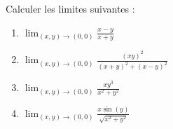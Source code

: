 
\begin{exercice}\label{exomazhe-0000}

	Calculer les limites suivantes :
	\begin{enumerate}

		\item
			$\lim_{(x,y)\to(0,0)}\frac{ x-y }{ x+y }$
		\item
			$\lim_{(x,y)\to(0,0)}\frac{ (xy)^2 }{ (x+y)^2+(x-y)^2 }$
		\item
			$\lim_{(x,y)\to(0,0)}\frac{ xy^3 }{ x^2+y^2 }$
		\item
			$\lim_{(x,y)\to(0,0)}\frac{ x\sin(y) }{ \sqrt{x^2+y^2} }$

	\end{enumerate}


\end{exercice}
